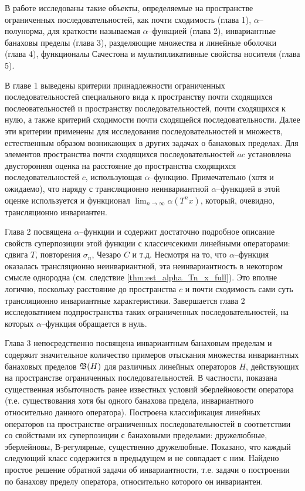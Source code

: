 В работе исследованы такие объекты, определяемые на пространстве ограниченных последовательностей,
как почти сходимость (глава 1), $\alpha$--полунорма, для краткости называемая $\alpha$--функцией (глава 2),
инвариантные банаховы пределы (глава 3), разделяющие множества и линейные оболочки (глава 4),
функционалы Сачестона и мультипликативные свойства носителя (глава 5).

В главе 1 выведены критерии принадлежности ограниченных последовательностей
специального вида к пространству почти сходящихся послеовательностей
и пространству последовательностей, почти сходящихся к нулю,
а также критерий сходимости почти сходящейся последовательности.
Далее эти критерии применены для исследования последовательностей и множеств,
естественным образом возникающих в других задачах о банаховых пределах.
Для элементов пространства почти сходящихся последовательностей $ac $
установлена двусторонняя оценка на расстояние до пространства сходящихся последовательностей $c$,
использующая $\alpha$--функцию.
Примечательно (хотя и ожидаемо), что наряду с трансляционно неинвариантной $\alpha$--функцией
в этой оценке используется и функционал $\lim_{n\to\infty}\alpha(T^n x)$,
который, очевидно, трансляционно инвариантен.

Глава 2 посвящена $\alpha$--функции и содержит достаточно подробное описание
свойств суперпозиции этой функции с классичсекими линейными операторами:
сдвига $T$, повторения $\sigma_n$, Чезаро $C$ и т.д.
Несмотря на то, что $\alpha$--функция оказалась трансляционно неинвариантной,
эта неинвариантность в некотором смысле однородна (см. следствие \ref{thm:est_alpha_Tn_x_full}).
Это вполне логично, поскольку расстояние до пространства $c$ и почти сходимость
сами суть трансляционно инвариантные характеристики.
Завершается глава 2 исследоватнием подпространства таких ограниченных последовательностей,
на которых $\alpha$--функция обращается в нуль.

Глава 3 непосредственно посвящена инвариантным банаховым пределам и содержит
значительное количество примеров отыскания множества инвариантных банаховых пределов $\mathfrak{B}(H)$
для различных линейных операторов $H$, действующих на пространстве ограниченных последовательностей.
В частности, показана существенная избыточность ранее известных условий эберлейновости оператора
(т.е. существования хотя бы одного банахова предела, инвариантного относительно данного оператора).
Построена классификация линейных операторов на пространстве ограниченных последовательностей
в соответствии со свойствами их суперпозиции с банаховыми пределами:
дружелюбные, эберлейновы, В-регулярные, существенно дружелюбные.
Показано, что каждый следующий класс содержится в предыдущем и не совпадает с ним.
Найдено простое решение обратной задачи об инвариантности,
т.е. задачи о построении по банахову пределу оператора, относительно которого он инвариантен.

